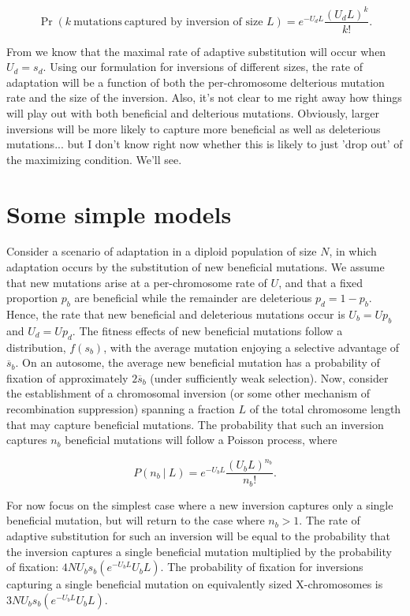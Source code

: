 \documentclass[11pt]{article}
\begin{document}
\begin{equation*}
	\Pr(k~\text{mutations}~\text{captured~by~inversion~of~size~}L) = e^{-U_d L} \frac{(U_d L)^{k}}{k!}.
\end{equation*}

	\noindent From \citet{Orr2000,OrrKim1998} we know that the maximal rate of adaptive substitution will occur when $U_d = s_d$. Using our formulation for inversions of different sizes, the rate of adaptation will be a function of both the per-chromosome delterious mutation rate and the size of the inversion. Also, it's not clear to me right away how things will play out with both beneficial and delterious mutations. Obviously, larger inversions will be more likely to capture more beneficial as well as deleterious mutations... but I don't know right now whether this is likely to just 'drop out' of the maximizing condition. We'll see.


\section*{Some simple models}

Consider a scenario of adaptation in a diploid population of size $N$, in which adaptation occurs by the substitution of new beneficial mutations. We assume that new mutations arise at a per-chromosome rate of $U$, and that a fixed proportion $p_b$ are beneficial while the remainder are deleterious $p_d = 1 - p_b$. Hence, the rate that new beneficial and deleterious mutations occur is $U_b = U p_b$ and $U_d = U p_d$. The fitness effects of new beneficial mutations follow a distribution, $f(s_b)$, with the average mutation enjoying a selective advantage of $\overline{s}_b$. On an autosome, the average new beneficial mutation has a probability of fixation of approximately $2\overline{s}_b$ (under sufficiently weak selection). Now, consider the establishment of a chromosomal inversion (or some other mechanism of recombination suppression) spanning a fraction $L$ of the total chromosome length that may capture beneficial mutations. The probability that such an inversion captures $n_b$ beneficial mutations will follow a Poisson process, where   

\begin{equation}
	P(n_b~|~L) = e^{-U_b L} \frac{(U_b L)^{n_b}}{n_b!}.
\end{equation}

\noindent For now focus on the simplest case where a new inversion captures only a single beneficial mutation, but will return to the case where $n_b > 1$. The rate of adaptive substitution for such an inversion will be equal to the probability that the inversion captures a single beneficial mutation multiplied by the probability of fixation: $4N U_b s_b (e^{-U_b L} U_b L)$. The probability of fixation for inversions capturing a single beneficial mutation on equivalently sized X-chromosomes is $3 N U_b s_b (e^{-U_b L} U_b L)$.
\end{document}
